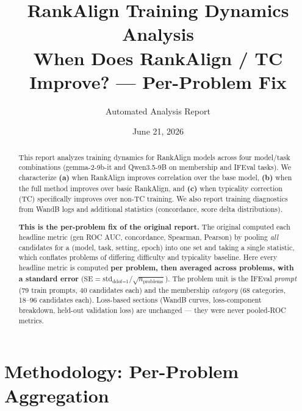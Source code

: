 \documentclass[11pt,a4paper]{article}
\title{RankAlign Training Dynamics Analysis\\
\large When Does RankAlign / TC Improve? --- \textbf{Per-Problem Fix}}
\author{Automated Analysis Report}
\date{June 21, 2026}
\begin{document}
\maketitle

\begin{abstract}
This report analyzes training dynamics for RankAlign models across four model/task combinations (gemma-2-9b-it and Qwen3.5-9B on membership and IFEval tasks). We characterize \textbf{(a)} when RankAlign improves correlation over the base model, \textbf{(b)} when the full method improves over basic RankAlign, and \textbf{(c)} when typicality correction (TC) specifically improves over non-TC training. We also report training diagnostics from WandB logs and additional statistics (concordance, score delta distributions).

\medskip
\noindent\textbf{This is the per-problem fix of the original report.} The original computed each
headline metric (gen ROC AUC, concordance, Spearman, Pearson) by pooling \emph{all} candidates for
a (model, task, setting, epoch) into one set and taking a single statistic, which conflates
problems of differing difficulty and typicality baseline. Here every headline metric is computed
\textbf{per problem, then averaged across problems, with a standard error}
($\textrm{SE}=\textrm{std}_{\textrm{ddof=1}}/\sqrt{n_{\textrm{problems}}}$). The problem unit is the
IFEval \emph{prompt} (79 train prompts, 40 candidates each) and the membership \emph{category} (68
categories, 18--96 candidates each). Loss-based sections (WandB curves, loss-component breakdown,
held-out validation loss) are unchanged --- they were never pooled-ROC metrics.
\end{abstract}

\section{Methodology: Per-Problem Aggregation}
\label{sec:perproblem-method}
\end{document}
